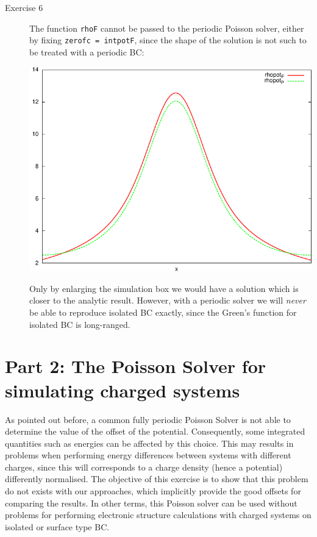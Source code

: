 \documentclass[a4paper]{article}
\begin{document}
\begin{description}
\item[Exercise 6] The function \texttt{rhoF} cannot be passed to the periodic Poisson solver, either by fixing \texttt{zerofc = intpotF}, since the shape of the solution is not such to be treated with a periodic BC:
\begin{center}
\includegraphics{PvsF.pdf}
\end{center}
Only by enlarging the simulation box we would have a solution which is closer to the analytic result. However, with a periodic solver we will \emph{never} be able to reproduce isolated BC exactly, since the Green's function for isolated BC is long-ranged.
\end{description}


\section*{Part 2: The Poisson Solver for simulating charged systems}
As pointed out before, a common fully periodic Poisson Solver is not able to determine the value of the offset of the potential. 
Consequently, some integrated quantities such as energies can be affected by this choice.
This may results in problems when performing energy differences between systems with different charges, since this will corresponds to a charge density (hence a potential) differently normalised.
The objective of this exercise is to show that this problem do not exists with our approaches, which implicitly provide the good offsets for comparing the results. In other terms, this Poisson solver can be used without problems for performing electronic structure calculations with charged systems on isolated or surface type BC.
\end{document}

